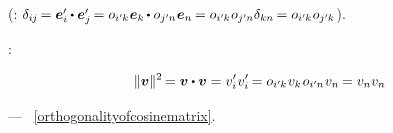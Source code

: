 \vspace{-0.2em}\noindent
(:
$\delta_{i\hspace{-0.1ex}j} \hspace{-0.2ex}
= \bm{e}'_i \hspace{-0.1ex} \dotp \bm{e}'_j \hspace{-0.2ex}
= \cosinematrix{i'\hspace{-0.1ex}k} \hspace{.1ex} \bm{e}_k \hspace{-0.15ex} \dotp \cosinematrix{j'\hspace{-0.1ex}n} \hspace{.1ex} \bm{e}_n \hspace{-0.2ex}
= \cosinematrix{i'\hspace{-0.1ex}k} \hspace{.1ex} \cosinematrix{j'\hspace{-0.1ex}n} \delta_{kn} \hspace{-0.2ex}
= \cosinematrix{i'\hspace{-0.1ex}k} \hspace{.1ex} \cosinematrix{j'\hspace{-0.1ex}k} \hspace{.1ex}$).

     :

\nopagebreak\vspace{-0.25em}\begin{equation*}
\|\bm{v}\|^2 \hspace{-0.22ex} = \bm{v} \dotp \bm{v}
= v'_i \hspace{.1ex} v'_i \hspace{-0.2ex}
= \cosinematrix{i'\hspace{-0.1ex}k} \hspace{.1ex} v_k \hspace{.2ex} \cosinematrix{i'\hspace{-0.1ex}n} \hspace{.1ex} v_n \hspace{-0.2ex}
= v_n v_n
\end{equation*}

\nopagebreak\vspace{-0.25em}\noindent
---  \textcolor{magenta}{}~\eqref{orthogonalityofcosinematrix}.


